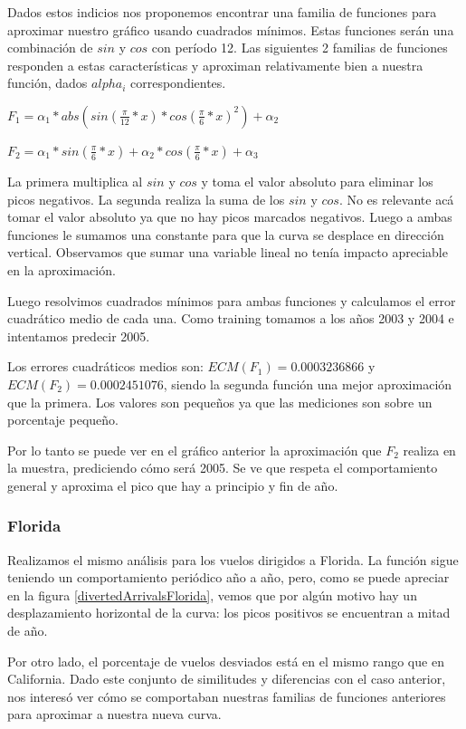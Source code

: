 Dados estos indicios nos proponemos encontrar una familia de funciones para aproximar nuestro gr\'afico usando cuadrados m\'inimos. Estas funciones ser\'an una combinaci\'on de $sin$ y $cos$ con per\'iodo 12. Las siguientes 2 familias de funciones responden a estas caracter\'isticas y aproximan relativamente bien a nuestra funci\'on, dados $alpha_i$ correspondientes.


$F_1 = \alpha_1 * abs(sin(\frac{\pi}{12}*x) * cos(\frac{\pi}{6}*x)^2) + \alpha_2$

$F_2 = \alpha_1 * sin(\frac{\pi}{6}*x) + \alpha_2 * cos(\frac{\pi}{6}*x) + \alpha_3$


La primera multiplica al $sin$ y $cos$ y toma el valor absoluto para eliminar los picos negativos. La segunda realiza la suma de los $sin$ y $cos$. No es relevante ac\'a tomar el valor absoluto ya que no hay picos marcados negativos. Luego a ambas funciones le sumamos una constante para que la curva se desplace en direcci\'on vertical. Observamos que sumar una variable lineal no ten\'ia impacto apreciable en la aproximaci\'on. 

Luego resolvimos cuadrados m\'inimos para ambas funciones y calculamos el error cuadr\'atico medio de cada una. Como training tomamos a los a\~nos 2003 y 2004 e intentamos predecir 2005.

Los errores cuadr\'aticos medios son: $ECM(F_1) = 0.0003236866$ y $ECM(F_2) = 0.0002451076$, siendo la segunda funci\'on una mejor aproximaci\'on que la primera. Los valores son peque\~nos ya que las mediciones son sobre un porcentaje peque\~no.

Por lo tanto se puede ver en el gr\'afico anterior la aproximaci\'on que $F_2$ realiza en la muestra, prediciendo c\'omo ser\'a 2005. Se ve que respeta el comportamiento general y aproxima el pico que hay a principio y fin de a\~no.

\subsubsection{Florida}

Realizamos el mismo an\'alisis para los vuelos dirigidos a Florida. La funci\'on sigue teniendo un comportamiento peri\'odico a\~no a a\~no, pero, como se puede apreciar en la figura \ref{divertedArrivalsFlorida}, vemos que por alg\'un motivo hay un desplazamiento horizontal de la curva: los picos positivos se encuentran a mitad de a\~no.

Por otro lado, el porcentaje de vuelos desviados est\'a en el mismo rango que en California.
Dado este conjunto de similitudes y diferencias con el caso anterior, nos interes\'o ver c\'omo se comportaban nuestras familias de funciones anteriores para aproximar a nuestra nueva curva.

